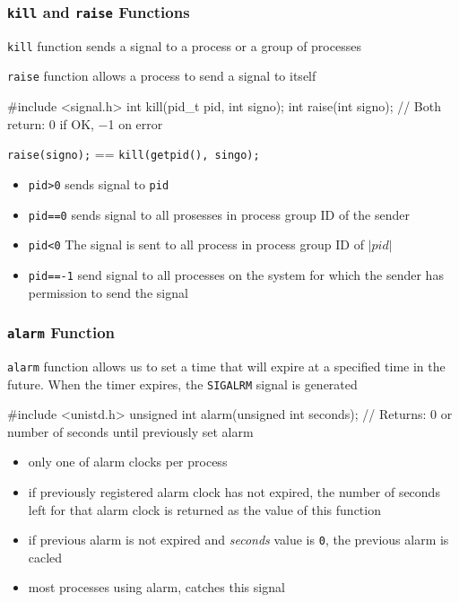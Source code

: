 \documentclass[newPxFont,sthlmFooter,nooffset]{beamer}
\begin{document}
\begin{frame}[fragile,t]
  \frametitle{\texttt{kill} and \texttt{raise} Functions}
\texttt{kill} function sends a signal to a process or a group of processes

\texttt{raise} function allows a process to send a signal to itself

\begin{codedef}
#include <signal.h>
int kill(pid_t pid, int signo); 
int raise(int signo);
// Both return: 0 if OK, −1 on error
\end{codedef}

{\hfill \texttt{raise(signo);} == \texttt{kill(getpid(), singo);}\hfill}

\begin{itemize}
\item \texttt{pid>0} sends signal to \texttt{pid}
\item \texttt{pid==0} sends signal to all prosesses in process group ID of the sender
\item \texttt{pid<0} The signal is sent to all process in process group ID of $|pid|$
\item \texttt{pid==-1} send signal to all processes on the system for which the sender has permission to send the signal
\end{itemize}
\end{frame}



\begin{frame}[fragile,t]
  \frametitle{\texttt{alarm} Function}
\texttt{alarm} function allows us to set a time that will expire at a specified time in the future. When the timer expires, the \texttt{SIGALRM} signal is generated
\begin{codedef}
#include <unistd.h>
unsigned int alarm(unsigned int seconds);
// Returns: 0 or number of seconds until previously set alarm  
\end{codedef}

\begin{itemize}
\item only one of alarm clocks per process
\item if previously registered alarm clock has not expired, the number of seconds left for that alarm clock is returned as the value of this function
\item if previous alarm is not expired and \textit{seconds} value is \texttt{0}, the previous alarm is cacled
\item most processes using alarm, catches this signal
\end{itemize}
\end{frame}
\end{document}
